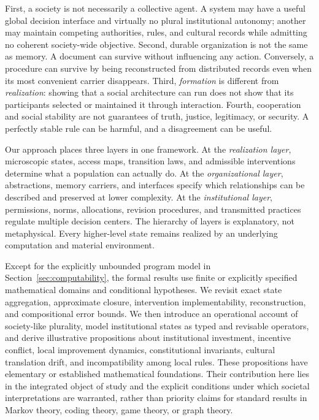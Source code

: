 \documentclass[11pt,letterpaper]{article}
\theoremstyle{plain}
\theoremstyle{definition}
\theoremstyle{remark}
\begin{document}
First, a society is not necessarily a collective agent. A system may have a useful global decision interface and virtually no plural institutional autonomy; another may maintain competing authorities, rules, and cultural records while admitting no coherent society-wide objective. Second, durable organization is not the same as memory. A document can survive without influencing any action. Conversely, a procedure can survive by being reconstructed from distributed records even when its most convenient carrier disappears. Third, \emph{formation} is different from \emph{realization}: showing that a social architecture can run does not show that its participants selected or maintained it through interaction. Fourth, cooperation and social stability are not guarantees of truth, justice, legitimacy, or security. A perfectly stable rule can be harmful, and a disagreement can be useful.

Our approach places three layers in one framework. At the \emph{realization layer}, microscopic states, access maps, transition laws, and admissible interventions determine what a population can actually do. At the \emph{organizational layer}, abstractions, memory carriers, and interfaces specify which relationships can be described and preserved at lower complexity. At the \emph{institutional layer}, permissions, norms, allocations, revision procedures, and transmitted practices regulate multiple decision centers. The hierarchy of layers is explanatory, not metaphysical. Every higher-level state remains realized by an underlying computation and material environment.

Except for the explicitly unbounded program model in Section~\ref{sec:computability}, the formal results use finite or explicitly specified mathematical domains and conditional hypotheses. We revisit exact state aggregation, approximate closure, intervention implementability, reconstruction, and compositional error bounds. We then introduce an operational account of society-like plurality, model institutional states as typed and revisable operators, and derive illustrative propositions about institutional investment, incentive conflict, local improvement dynamics, constitutional invariants, cultural translation drift, and incompatibility among local rules. These propositions have elementary or established mathematical foundations. Their contribution here lies in the integrated object of study and the explicit conditions under which societal interpretations are warranted, rather than priority claims for standard results in Markov theory, coding theory, game theory, or graph theory.
\end{document}
